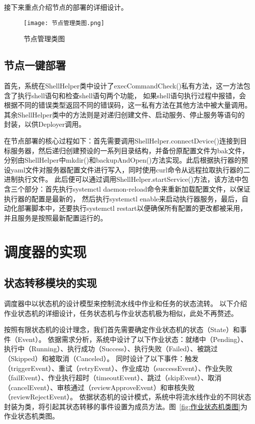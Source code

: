 接下来重点介绍节点的部署的详细设计。

\begin{figure}[h]
  \centering
  \texttt{[image: 节点管理类图.png]}
  \caption{节点管理类图}
  \label{fig:节点管理类图}
\end{figure}

\subsection{节点一键部署}
首先，系统在ShellHelper类中设计了execCommandCheck()私有方法，这一方法包含了执行shell语句和检查shell语句两个功能，
如果shell语句执行过程中报错，会根据不同的错误类型返回不同的错误码，这一私有方法在其他方法中被大量调用。
其余ShellHelper类中的方法则是对递归创建文件、启动服务、停止服务等语句的封装，以供Deployer调用。

在节点部署的核心过程如下：首先需要调用ShellHelper.connectDevice()连接到目标服务器，然后递归创建预设的一系列目录结构，并备份原配置文件为bak文件，
分别由ShellHelper中mkdir()和backupAndOpen()方法实现。此后根据执行器的预设yaml文件对服务器配置文件进行写入，同时使用curl命令从远程拉取执行器的二进制执行文件。
此后便可以通过调用ShellHelper.startService()方法，该方法中包含三个部分：首先执行systemctl daemon-reload命令来重新加载配置文件，以保证执行器的配置是最新的，
然后执行systemctl enable来启动执行器服务，最后，自动化部署脚本中，还要执行systemctl restart以便确保所有配置的更改都被采用，并且服务是按照最新配置运行的。

\section{调度器的实现}

\subsection{状态转移模块的实现}

调度器中以状态机的设计模型来控制流水线中作业和任务的状态流转。
以下介绍作业状态机的详细设计，任务状态机与作业状态机极为相似，此处不再赘述。

按照有限状态机的设计理念，我们首先需要确定作业状态机的状态（State）和事件（Event）。
依据需求分析，系统中设计了以下作业状态：就绪中（Pending）、执行中（Running）、执行成功（Success）、执行失败（Failed）、被跳过（Skipped）和被取消（Canceled）。
同时设计了以下事件：触发（triggerEvent）、重试（retryEvent）、作业成功（successEvent）、作业失败（failEvent）、作业执行超时（timeoutEvent）、跳过（skipEvent）、取消（cancelEvent）、审核通过（reviewApproveEvent）和审核失败（reviewRejectEvent）。
依据状态机的设计模式，系统中将流水线作业的不同状态封装为类，将引起其状态转移的事件设置为成员方法。图~\ref{fig:作业状态机类图}为作业状态机类图。

